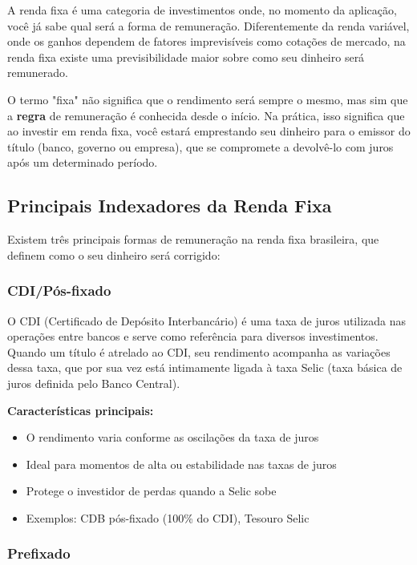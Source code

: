 \noindent A renda fixa é uma categoria de investimentos onde, no momento da aplicação, você já sabe qual será a forma de remuneração. Diferentemente da renda variável, onde os ganhos dependem de fatores imprevisíveis como cotações de mercado, na renda fixa existe uma previsibilidade maior sobre como seu dinheiro será remunerado.

\vspace{0.5cm}
\noindent O termo "fixa" não significa que o rendimento será sempre o mesmo, mas sim que a \textbf{regra} de remuneração é conhecida desde o início. Na prática, isso significa que ao investir em renda fixa, você estará emprestando seu dinheiro para o emissor do título (banco, governo ou empresa), que se compromete a devolvê-lo com juros após um determinado período.

\subsection{Principais Indexadores da Renda Fixa}

\noindent Existem três principais formas de remuneração na renda fixa brasileira, que definem como o seu dinheiro será corrigido:

\subsubsection{CDI/Pós-fixado}

\noindent O CDI (Certificado de Depósito Interbancário) é uma taxa de juros utilizada nas operações entre bancos e serve como referência para diversos investimentos. Quando um título é atrelado ao CDI, seu rendimento acompanha as variações dessa taxa, que por sua vez está intimamente ligada à taxa Selic (taxa básica de juros definida pelo Banco Central).

\vspace{0.5cm}
\noindent \textbf{Características principais:}
\begin{itemize}[leftmargin=*]
    \item O rendimento varia conforme as oscilações da taxa de juros
    \item Ideal para momentos de alta ou estabilidade nas taxas de juros
    \item Protege o investidor de perdas quando a Selic sobe
    \item Exemplos: CDB pós-fixado (100\% do CDI), Tesouro Selic
\end{itemize}

\subsubsection{Prefixado}

